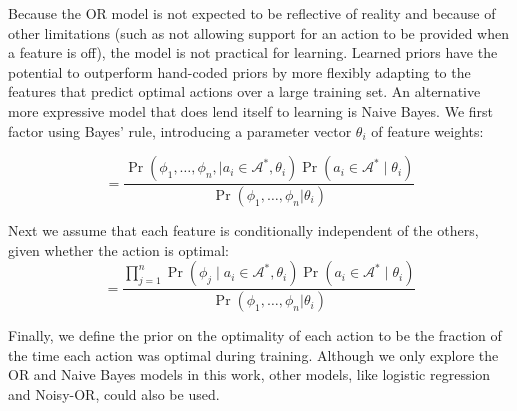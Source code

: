 \documentclass[letterpaper]{article}
\begin{document}
Because the OR model is not expected to be reflective of
reality and because of other limitations (such as not allowing support
for an action to be provided when a feature is off), the model is not
practical for learning.  Learned priors have the potential to outperform
hand-coded priors by more flexibly adapting to the
features that predict optimal actions over a large training set.  An
alternative more expressive model that does lend itself to learning is
Naive Bayes. We first factor using Bayes' rule, introducing a parameter vector $\theta_i$ of
feature weights:

\begin{equation}
= \frac{\Pr(\phi_1, \ldots, \phi_{n}, \mid a_i \in \mathcal{A}^*, \theta_i) \Pr(a_i \in \mathcal{A}^* \mid \theta_i)}{\Pr(\phi_1, \ldots, \phi_{n} | \theta_i)}
\label{eq:bayes}
\end{equation}

Next we assume that each feature is conditionally independent of the others, given whether the action is optimal:
\begin{equation}
= \frac{\prod_{j=1}^{n} \Pr(\phi_j \mid a_i \in \mathcal{A}^*, \theta_i) \Pr(a_i \in \mathcal{A}^* \mid \theta_i) }{\Pr(\phi_1, \ldots, \phi_{n} | \theta_i)}
\label{eq:final}
\end{equation}

Finally, we define the prior on the optimality of each action to be
the fraction of the time each action was optimal during training.
Although we only explore the OR and Naive Bayes
models in this work, other models, like logistic regression and Noisy-OR, could also be used.


\end{document}
